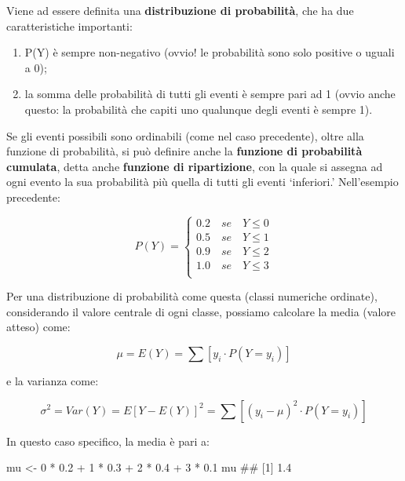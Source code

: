 \documentclass[a4paper,12pt,oneside]{book}
\providecommand{\tightlist}{%
  \setlength{\itemsep}{0pt}\setlength{\parskip}{0pt}}
\newenvironment{Shaded}{\begin{snugshade}}{\end{snugshade}}
\newcommand{\DecValTok}[1]{#1}
\newcommand{\FloatTok}[1]{#1}
\newcommand{\SpecialCharTok}[1]{#1}
\newcommand{\DocumentationTok}[1]{#1}
\newcommand{\OtherTok}[1]{#1}
\newcommand{\NormalTok}[1]{#1}
\begin{document}
Viene ad essere definita una \textbf{distribuzione di probabilità}, che ha due caratteristiche importanti:

\begin{enumerate}
\def\labelenumi{\arabic{enumi}.}
\tightlist
\item
  P(Y) è sempre non-negativo (ovvio! le probabilità sono solo positive o uguali a 0);
\item
  la somma delle probabilità di tutti gli eventi è sempre pari ad 1 (ovvio anche questo: la probabilità che capiti uno qualunque degli eventi è sempre 1).
\end{enumerate}

Se gli eventi possibili sono ordinabili (come nel caso precedente), oltre alla funzione di probabilità, si può definire anche la \textbf{funzione di probabilità cumulata}, detta anche \textbf{funzione di ripartizione}, con la quale si assegna ad ogni evento la sua probabilità più quella di tutti gli eventi `inferiori.' Nell'esempio precedente:

\[
P(Y) = \left\{ \begin{array}{l}
 0.2\,\,\,\,\,\,se\,\,\,\,\,\,Y \leq 0 \\ 
 0.5\,\,\,\,\,\,se\,\,\,\,\,\,Y \leq 1 \\ 
 0.9\,\,\,\,\,\,se\,\,\,\,\,\,Y \leq 2 \\ 
 1.0\,\,\,\,\,\,se\,\,\,\,\,\,Y \leq 3 \\ 
 \end{array} \right.
\]

Per una distribuzione di probabilità come questa (classi numeriche ordinate), considerando il valore centrale di ogni classe, possiamo calcolare la media (valore atteso) come:

\[
\mu  = E(Y) = \sum{\left[ y_i \cdot P(Y = y_i ) \right]}
\]

e la varianza come:

\[\sigma ^2  = Var(Y) = E\left[ {Y - E(Y)} \right]^2  = \sum{ \left[ {\left( {y_i  - \mu } \right)^2 \cdot P(Y = y_i )} \right]}\]

In questo caso specifico, la media è pari a:

\begin{Shaded}
\begin{Highlighting}[]
\NormalTok{mu }\OtherTok{\textless{}{-}} \DecValTok{0} \SpecialCharTok{*} \FloatTok{0.2} \SpecialCharTok{+} \DecValTok{1} \SpecialCharTok{*} \FloatTok{0.3} \SpecialCharTok{+} \DecValTok{2} \SpecialCharTok{*} \FloatTok{0.4} \SpecialCharTok{+} \DecValTok{3} \SpecialCharTok{*} \FloatTok{0.1}
\NormalTok{mu}
\DocumentationTok{\#\# [1] 1.4}
\end{Highlighting}
\end{Shaded}
\end{document}
